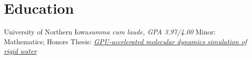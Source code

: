 \section{Education}
		{University of Northern Iowa}{}{\textit{summa cum laude, GPA 3.97/4.00}}
		{Minor: Mathematics; Honors Thesis: \href{http://www.tasseff.com/documents/reports/2012-gpu_accelerated_molecular_dynamics_simulation_of_rigid_water.pdf}{\textit{GPU-accelerated molecular dynamics simulation of rigid water}}}
